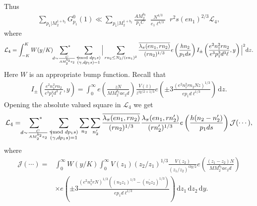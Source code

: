 \documentclass[12pt,a4paper,twoside, reqno]{amsart}
\newcommand{\shortmod}{\ensuremath{\negthickspace \negthickspace \negthickspace \pmod}}
\newcommand{\sumstar}{\sideset{}{^*}\sum}
\begin{document}
Thus 
\begin{align}\label{l4}
    \sum_{p_1| M_2^{1+b_2}} G_{p_1}^0(1)  \ll    \sum_{p_1| M_2^{1+b_2}} \frac{A M_2^{b_2} }{p_1 C}\mathop{\sum_{\substack {e_1e_2 \ll N_1 \\ e_1\mid M_2^{1+b_2} }   }}     \frac{ {N^{4/3}}  }{  {e_1 \ell^{4/3}}} \mathop{\sum_{ \substack{n_1rs= \ell \\ (n_1s,p_1d)=1 \\ r | (p_1d)^\infty \\ en_1 \asymp N_1  }}} r^2s (en_1)^{2/3}    \mathcal{L}_4,
\end{align}
where 
\begin{align*}
    \mathcal{L}_4 =\int_{-K}^KW(y/K) \mathop{\sumstar_{ \substack{d \sim \frac{C}{A M_2^{b_2} e_2}
       } } }\sum_{\substack{ \gamma \shortmod{dp_1s} \\ (\gamma, dp_1s)=1 }   } \Big| \sum_{rn_2 \leq   N_2/(en_1)^2}  \frac{\overline{\lambda_\pi(en_1,rn_2)}}{ {(rn_2)^{1/3}}  }  e\left( \frac{hn_2}{p_1ds}\right)  I_{\pm} \left( \frac{e^2n_1^2rn_2}{e^3p_1^3d^3 \ell},y\right)   \Big|^2 \mathrm{d}z.
\end{align*}
Here $W$ is an appropriate bump function. 
Recall that 
\begin{align}
    I_{\pm} \left( \frac{e^2n_1^2rn_2}{e^3p_1^3d^3 \ell},y \right)=\int_{0}^{\infty}  e\left(\frac{ z N}{MM_2^{b_2}ae_2d} \right)  \frac{V(z)}{ z^{iy/2+1/3}}  e\left(\pm 3 \frac{(e^2n_1^2rn_2 Nz)^{1/3} }{  ep_1d \ell^{{1/3}}}\right)  \, \mathrm{d} z.
\end{align}
  Opening the absolute valued square in $ \mathcal{L}_4 $
  we get 
  \begin{align*}
        \mathcal{L}_4 = \mathop{\sumstar_{ \substack{d \sim \frac{C}{A M_2^{b_2} e_2}
       } } }\sum_{\substack{ \gamma \shortmod{dp_1s} \\ (\gamma, dp_1s)=1 }   }  \sum_{n_2} \sum_{n_2^\prime} \frac{\overline{\lambda_\pi(en_1,rn_2)}}{ {(rn_2)^{1/3}}  }\frac{{\lambda_\pi(en_1,rn_2^\prime)}}{ {(rn_2^\prime)^{1/3}}  }  e\left( \frac{h(n_2-n_2^\prime)}{p_1ds}\right) \mathcal{J}(\cdots),   \end{align*}
  where 
\begin{align*}
   \mathcal{J}(\cdots)=&\int_{0}^{\infty} W(y/K) \int_{0}^{\infty} {V(z_1)(z_2/z_1)^{1/3} }\frac{V(z_2)}{(z_1/z_2)^{i3y/2}}  e\left(\frac{ (z_1-z_2{}) N}{MM_2^{b_2}ae_2d} \right)  \\
   & \times e\left(\pm 3 \frac{(e^2n_1^2r N)^{1/3}((n_2z_1)^{1/3}-(n_2^\prime z_2)^{1/3}) }{  ep_1d \ell^{{1/3}}}\right)  \, \mathrm{d} z_1 \,  \mathrm{d} z_2 \,  \mathrm{d} y.
\end{align*}
\end{document}
